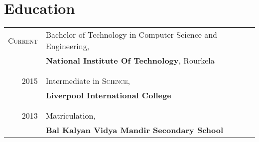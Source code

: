 \documentclass[a4paper,10pt]{article}
\begin{document}
\section{Education}
\begin{tabular}{rl}	
 \textsc{Current} & Bachelor of Technology in Computer Science and Engineering,\\ & \textbf{National Institute Of Technology}, Rourkela\\

\\ \\
\textsc{2015} & Intermediate in \textsc{Science},\\ & \textbf{Liverpool International College}\\

\\ \\
\textsc{2013} & Matriculation,\\ & \textbf{Bal Kalyan Vidya Mandir Secondary School}\\

\end{tabular}
\end{document}
